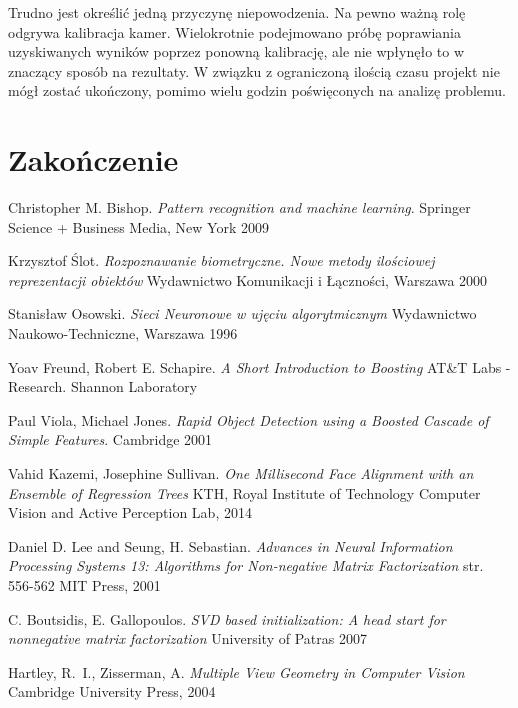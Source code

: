 \documentclass[oneside, eng]{mgr}
\begin{document}
Trudno jest określić jedną przyczynę niepowodzenia. Na pewno ważną rolę odgrywa kalibracja kamer. Wielokrotnie podejmowano próbę poprawiania uzyskiwanych wyników poprzez ponowną kalibrację, ale nie wpłynęło to w znaczący sposób na rezultaty. W związku z ograniczoną ilością czasu projekt nie mógł zostać ukończony, pomimo wielu godzin poświęconych na analizę problemu.

\chapter{Zakończenie}



\newpage
\begin{thebibliography}{9}

Christopher M. Bishop.
\textit{Pattern recognition and machine learning}.
Springer Science + Business Media, New York 2009

Krzysztof Ślot.
\textit{Rozpoznawanie biometryczne. Nowe metody ilościowej reprezentacji obiektów}
Wydawnictwo Komunikacji i Łączności, Warszawa 2000

Stanisław Osowski.
\textit{Sieci Neuronowe w ujęciu algorytmicznym}
Wydawnictwo Naukowo-Techniczne, Warszawa 1996

Yoav Freund, Robert E. Schapire.
\textit{A Short Introduction to Boosting}
AT\&T Labs - Research. Shannon Laboratory

Paul Viola, Michael Jones.
\textit{Rapid Object Detection using a Boosted Cascade of Simple Features}.
Cambridge 2001

Vahid Kazemi, Josephine Sullivan.
\textit{One Millisecond Face Alignment with an Ensemble of Regression Trees}
KTH, Royal Institute of Technology
Computer Vision and Active Perception Lab, 2014

Daniel D. Lee and Seung, H. Sebastian.
\textit{Advances in Neural Information Processing Systems 13: Algorithms for Non-negative Matrix Factorization}
str. 556-562
MIT Press, 2001

C. Boutsidis, E. Gallopoulos.
\textit{SVD based initialization: A head start for nonnegative matrix factorization}
University of Patras 2007

Hartley, R.~I., Zisserman, A.
\textit{Multiple View Geometry in Computer Vision}
Cambridge University Press, 2004


\end{thebibliography}
\end{document}
